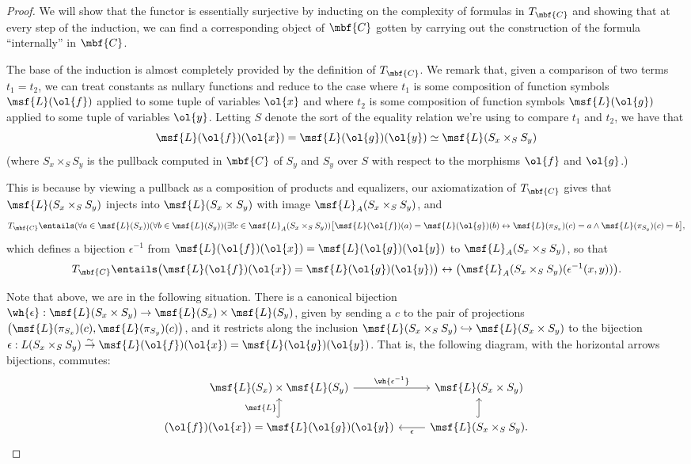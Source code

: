 \documentclass[11pt]{article}
\begin{document}
  \begin{proof}
    We will show that the functor is essentially surjective by inducting on the complexity of formulas in $T_{\mbf{C}}$ and showing that at every step of the induction, we can find a corresponding object of $\mbf{C}$ gotten by carrying out the construction of the formula ``internally'' in $\mbf{C}$.

    The base of the induction is almost completely provided by the definition of $T_{\mbf{C}}$. We remark that, given a comparison of two terms $t_1 = t_2$, we can treat constants as nullary functions and reduce to the case where $t_1$ is some composition of function symbols $\msf{L}(\ol{f})$ applied to some tuple of variables $\ol{x}$ and where $t_2$ is some composition of function symbols $\msf{L}(\ol{g})$ applied to some tuple of variables $\ol{y}$. Letting $S$ denote the sort of the equality relation we're using to compare $t_1$ and $t_2$, we have that $$\msf{L}(\ol{f})(\ol{x}) = \msf{L}(\ol{g})(\ol{y}) \simeq \msf{L}(S_x \times_S S_y)$$ (where $S_x \times_S S_y$ is the pullback computed in $\mbf{C}$ of $S_y$ and $S_y$ over $S$ with respect to the morphisms $\ol{f}$ and $\ol{g}$.)

    This is because by viewing a pullback as a composition of products and equalizers, our axiomatization of $T_{\mbf{C}}$ gives that $\msf{L}(S_x \times_S S_y)$ injects into $\msf{L}(S_x \times S_y)$ with image $\msf{L}_A(S_x \times_S S_y)$, and
    $$
T_{\mbf{C}} \entails (\forall a \in \msf{L}(S_x)) (\forall b \in \msf{L}(S_y)) (\exists! c \in \msf{L}_A(S_x \times_S S_y)) \bigl[\msf{L}(\ol{f})(a) = \msf{L}(\ol{g})(b)\leftrightarrow \msf{L}(\pi_{S_x})(c) = a \land \msf{L}(\pi_{S_y})(c) = b \bigr],
$$
which defines a bijection $\epsilon^{-1}$ from $\msf{L}(\ol{f})(\ol{x}) =\msf{L}(\ol{g})(\ol{y})$ to $\msf{L}_A(S_x \times_S S_y)$, so that
$$
T_{\mbf{C}} \entails \bigl(\msf{L}(\ol{f})(\ol{x}) = \msf{L}(\ol{g})(\ol{y})\bigr) \leftrightarrow \bigl(\msf{L}_A(S_x \times_S S_y)(\epsilon^{-1}(x,y))\bigr).
$$

Note that above, we are in the following situation. There is a canonical bijection $\wh{\epsilon} : \msf{L}(S_x \times S_y) \to \msf{L}(S_x) \times \msf{L}(S_y)$, given by sending a $c$ to the pair of projections $\bigl(\msf{L}(\pi_{S_x})(c), \msf{L}(\pi_{S_y})(c)\bigr)$, and it restricts along the inclusion $\msf{L}(S_x \times_S S_y) \hookrightarrow \msf{L}(S_x \times S_y)$ to the bijection $\epsilon : L(S_x \times_S S_y) \overset{\sim}{\to} \msf{L}(\ol{f})(\ol{x}) = \msf{L}(\ol{g})(\ol{y})$. That is, the following diagram, with the horizontal arrows bijections, commutes:
$$
\begin{tikzcd}[ampersand replacement = \&]
\msf{L}(S_x) \times \msf{L}(S_y) \arrow{r}{\wh{\epsilon^{-1}}}  \& \msf{L}(S_x \times S_y)  \\
 \arrow[hook]{u} \msf{L}(\ol{f})(\ol{x}) = \msf{L}(\ol{g})(\ol{y})   \& \msf{L}(S_x \times_S S_y) \arrow{l}{\epsilon} \arrow[hook]{u}.
\end{tikzcd}
$$


\end{proof}
\end{document}
